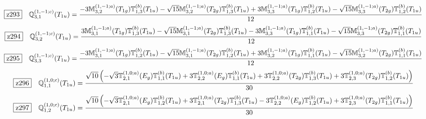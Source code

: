 \documentclass[fleqn,10pt,landscape]{jsarticle}
\begin{document}
\begin{dmath*}
\hspace*{3mm}\fbox{z293}\quad \mathbb{Q}_{3,1}^{(1,-1;c)}(T_{1u})=\frac{- 3 \mathbb{M}_{3,2}^{(1,-1;a)}(T_{1g}) \mathbb{T}_{1,3}^{(b)}(T_{1u}) - \sqrt{15} \mathbb{M}_{3,2}^{(1,-1;a)}(T_{2g}) \mathbb{T}_{1,3}^{(b)}(T_{1u}) + 3 \mathbb{M}_{3,3}^{(1,-1;a)}(T_{1g}) \mathbb{T}_{1,2}^{(b)}(T_{1u}) - \sqrt{15} \mathbb{M}_{3,3}^{(1,-1;a)}(T_{2g}) \mathbb{T}_{1,2}^{(b)}(T_{1u})}{12}
\end{dmath*}
\begin{dmath*}
\hspace*{3mm}\fbox{z294}\quad \mathbb{Q}_{3,2}^{(1,-1;c)}(T_{1u})=\frac{3 \mathbb{M}_{3,1}^{(1,-1;a)}(T_{1g}) \mathbb{T}_{1,3}^{(b)}(T_{1u}) - \sqrt{15} \mathbb{M}_{3,1}^{(1,-1;a)}(T_{2g}) \mathbb{T}_{1,3}^{(b)}(T_{1u}) - 3 \mathbb{M}_{3,3}^{(1,-1;a)}(T_{1g}) \mathbb{T}_{1,1}^{(b)}(T_{1u}) - \sqrt{15} \mathbb{M}_{3,3}^{(1,-1;a)}(T_{2g}) \mathbb{T}_{1,1}^{(b)}(T_{1u})}{12}
\end{dmath*}
\begin{dmath*}
\hspace*{3mm}\fbox{z295}\quad \mathbb{Q}_{3,3}^{(1,-1;c)}(T_{1u})=\frac{- 3 \mathbb{M}_{3,1}^{(1,-1;a)}(T_{1g}) \mathbb{T}_{1,2}^{(b)}(T_{1u}) - \sqrt{15} \mathbb{M}_{3,1}^{(1,-1;a)}(T_{2g}) \mathbb{T}_{1,2}^{(b)}(T_{1u}) + 3 \mathbb{M}_{3,2}^{(1,-1;a)}(T_{1g}) \mathbb{T}_{1,1}^{(b)}(T_{1u}) - \sqrt{15} \mathbb{M}_{3,2}^{(1,-1;a)}(T_{2g}) \mathbb{T}_{1,1}^{(b)}(T_{1u})}{12}
\end{dmath*}
\begin{dmath*}
\hspace*{3mm}\fbox{z296}\quad \mathbb{Q}_{1,1}^{(1,0;c)}(T_{1u})=\frac{\sqrt{10} \left(- \sqrt{3} \mathbb{T}_{2,1}^{(1,0;a)}(E_{g}) \mathbb{T}_{1,1}^{(b)}(T_{1u}) + 3 \mathbb{T}_{2,2}^{(1,0;a)}(E_{g}) \mathbb{T}_{1,1}^{(b)}(T_{1u}) + 3 \mathbb{T}_{2,2}^{(1,0;a)}(T_{2g}) \mathbb{T}_{1,3}^{(b)}(T_{1u}) + 3 \mathbb{T}_{2,3}^{(1,0;a)}(T_{2g}) \mathbb{T}_{1,2}^{(b)}(T_{1u})\right)}{30}
\end{dmath*}
\begin{dmath*}
\hspace*{3mm}\fbox{z297}\quad \mathbb{Q}_{1,2}^{(1,0;c)}(T_{1u})=\frac{\sqrt{10} \left(- \sqrt{3} \mathbb{T}_{2,1}^{(1,0;a)}(E_{g}) \mathbb{T}_{1,2}^{(b)}(T_{1u}) + 3 \mathbb{T}_{2,1}^{(1,0;a)}(T_{2g}) \mathbb{T}_{1,3}^{(b)}(T_{1u}) - 3 \mathbb{T}_{2,2}^{(1,0;a)}(E_{g}) \mathbb{T}_{1,2}^{(b)}(T_{1u}) + 3 \mathbb{T}_{2,3}^{(1,0;a)}(T_{2g}) \mathbb{T}_{1,1}^{(b)}(T_{1u})\right)}{30}
\end{dmath*}
\end{document}
